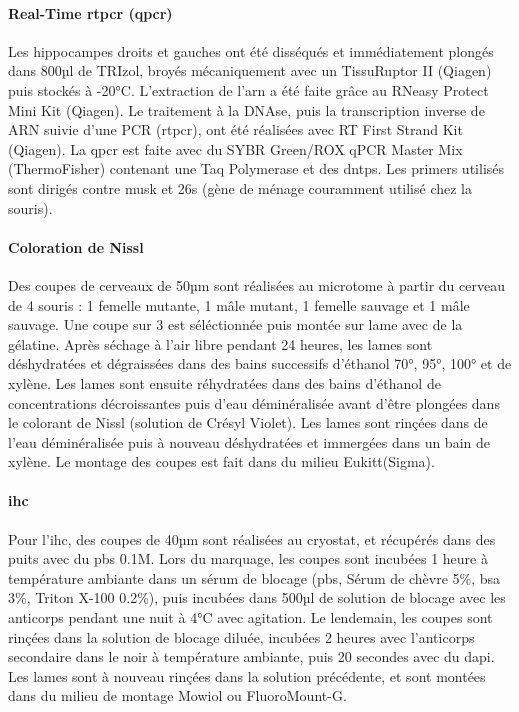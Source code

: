 \paragraph{Real-Time \acrshort{rtpcr} (\acrshort{qpcr})}
\label{par:qPCR}
	Les hippocampes droits et gauches ont été disséqués et immédiatement plongés dans 800µl de TRIzol\textregistered, broyés mécaniquement avec un TissuRuptor II (Qiagen\textregistered) puis stockés à -20°C. L'extraction de l'\acrshort{arn} a été faite grâce au RNeasy Protect Mini Kit (Qiagen\textregistered). Le traitement à la DNAse, puis la transcription inverse de ARN suivie d'une PCR (\acrshort{rtpcr}), ont été réalisées avec RT First Strand Kit (Qiagen\textregistered). La \gls{qpcr} est faite avec du SYBR Green/ROX qPCR Master Mix (ThermoFisher\textregistered) contenant une Taq Polymerase et des \glspl{dntp}. Les primers utilisés sont dirigés contre \gls{musk} et \acrshort{26s} (gène de ménage couramment utilisé chez la souris).
	
\paragraph{Coloration de Nissl}
\label{par:Nissl}
	Des coupes de cerveaux de 50µm sont réalisées au microtome à partir du cerveau de 4 souris : 1 femelle mutante, 1 mâle mutant, 1 femelle sauvage et 1 mâle sauvage. Une coupe sur 3 est séléctionnée puis montée sur lame avec de la gélatine. Après séchage à l'air libre pendant 24 heures, les lames sont déshydratées et dégraissées dans des bains successifs d'éthanol 70°, 95°, 100° et de xylène. Les lames sont ensuite réhydratées dans des bains d'éthanol de concentrations décroissantes puis d'eau déminéralisée avant d'être plongées dans le colorant de Nissl (solution de Crésyl Violet).  Les lames sont rinçées dans de l'eau déminéralisée puis à nouveau déshydratées et immergées dans un bain de xylène. Le montage des coupes est fait dans du milieu Eukitt\textregistered (Sigma).
	
\paragraph{\Acrlong{ihc}}	
\label{par:ihc}
	Pour l'\Gls{ihc}, des coupes de 40µm sont réalisées au cryostat, et récupérés dans des puits avec du \acrshort{pbs} 0.1M. Lors du marquage, les coupes sont incubées 1 heure à température ambiante dans un sérum de blocage (\acrshort{pbs}, Sérum de chèvre 5\%, \acrshort{bsa} 3\%, Triton X-100 0.2\%), puis  incubées dans 500µl de solution de blocage avec les anticorps pendant une nuit à 4°C avec agitation. Le lendemain, les coupes sont rinçées dans la solution de blocage diluée, incubées 2 heures avec l'anticorps secondaire dans le noir à température ambiante, puis 20 secondes avec du \gls{dapi}. Les lames sont à nouveau rinçées dans la solution précédente, et sont montées dans du milieu de montage Mowiol ou FluoroMount-G\textregistered.
	

